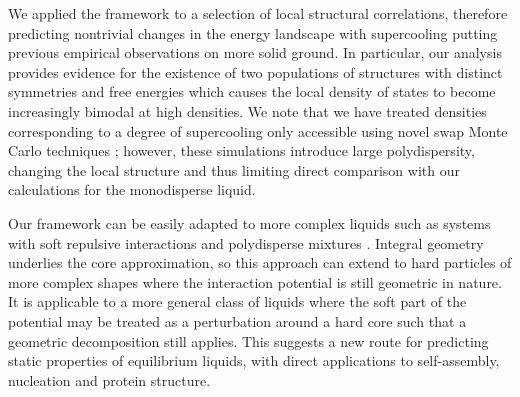\documentclass[11pt,twoside]{report}
\begin{document}
We applied the framework to a selection of local structural correlations, therefore predicting nontrivial changes in the energy landscape with supercooling putting previous empirical observations on more solid ground.
In particular, our analysis provides evidence for the existence of two populations of structures with distinct symmetries and free energies which causes the local density of states to become increasingly bimodal at high densities.
We note that we have treated densities corresponding to a degree of supercooling only accessible using novel swap Monte Carlo techniques \cite{BerthierPRL2016}; however, these simulations introduce large polydispersity, changing the local structure \cite{CoslovichJPCM2018} and thus limiting direct comparison with our calculations for the monodisperse liquid.

Our framework can be easily adapted to more complex liquids such as systems with soft repulsive interactions and polydisperse mixtures \cite{KodamaJCP2011}.
Integral geometry underlies the core approximation, so this approach can extend to hard particles of more complex shapes where the interaction potential is still geometric in nature.
It is applicable to a more general class of liquids where the soft part of the potential may be treated as a perturbation around a hard core \cite{Hansen2013} such that a geometric decomposition still applies.
This suggests a new route for predicting static properties of equilibrium liquids, with direct applications to self-assembly, nucleation and protein structure.


\end{document}
